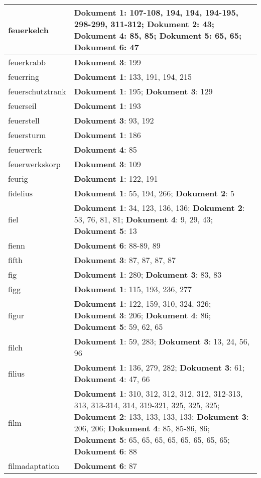 \documentclass[a5paper]{article}
\begin{document}
\begin{longtable}[l]{|l|p{3in}|}
\hline
feuerkelch & \textbf{Dokument 1}: 107-108, 194, 194, 194-195, 298-299, 311-312; \textbf{Dokument 2}: 43; \textbf{Dokument 4}: 85, 85; \textbf{Dokument 5}: 65, 65; \textbf{Dokument 6}: 47 \\
\hline
feuerkrabb & \textbf{Dokument 3}: 199 \\
\hline
feuerring & \textbf{Dokument 1}: 133, 191, 194, 215 \\
\hline
feuerschutztrank & \textbf{Dokument 1}: 195; \textbf{Dokument 3}: 129 \\
\hline
feuerseil & \textbf{Dokument 1}: 193 \\
\hline
feuerstell & \textbf{Dokument 3}: 93, 192 \\
\hline
feuersturm & \textbf{Dokument 1}: 186 \\
\hline
feuerwerk & \textbf{Dokument 4}: 85 \\
\hline
feuerwerkskorp & \textbf{Dokument 3}: 109 \\
\hline
feurig & \textbf{Dokument 1}: 122, 191 \\
\hline
fidelius & \textbf{Dokument 1}: 55, 194, 266; \textbf{Dokument 2}: 5 \\
\hline
fiel & \textbf{Dokument 1}: 34, 123, 136, 136; \textbf{Dokument 2}: 53, 76, 81, 81; \textbf{Dokument 4}: 9, 29, 43; \textbf{Dokument 5}: 13 \\
\hline
fienn & \textbf{Dokument 6}: 88-89, 89 \\
\hline
fifth & \textbf{Dokument 3}: 87, 87, 87, 87 \\
\hline
fig & \textbf{Dokument 1}: 280; \textbf{Dokument 3}: 83, 83 \\
\hline
figg & \textbf{Dokument 1}: 115, 193, 236, 277 \\
\hline
figur & \textbf{Dokument 1}: 122, 159, 310, 324, 326; \textbf{Dokument 3}: 206; \textbf{Dokument 4}: 86; \textbf{Dokument 5}: 59, 62, 65 \\
\hline
filch & \textbf{Dokument 1}: 59, 283; \textbf{Dokument 3}: 13, 24, 56, 96 \\
\hline
filius & \textbf{Dokument 1}: 136, 279, 282; \textbf{Dokument 3}: 61; \textbf{Dokument 4}: 47, 66 \\
\hline
film & \textbf{Dokument 1}: 310, 312, 312, 312, 312, 312-313, 313, 313-314, 314, 319-321, 325, 325, 325; \textbf{Dokument 2}: 133, 133, 133, 133; \textbf{Dokument 3}: 206, 206; \textbf{Dokument 4}: 85, 85-86, 86; \textbf{Dokument 5}: 65, 65, 65, 65, 65, 65, 65, 65; \textbf{Dokument 6}: 88 \\
\hline
filmadaptation & \textbf{Dokument 6}: 87 \\

\end{longtable}
\end{document}
